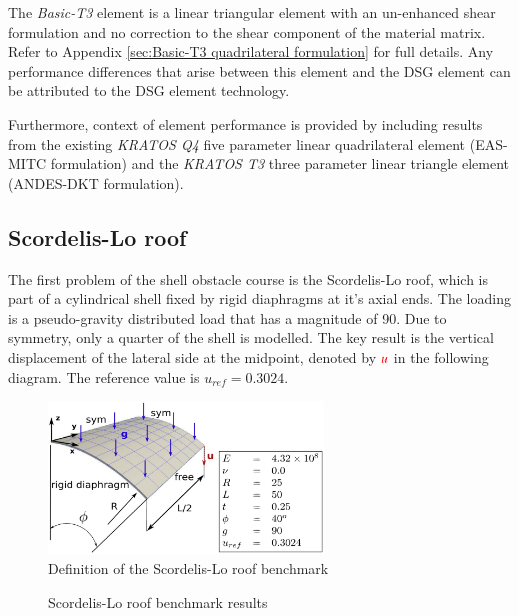 The \textit{Basic-T3} element is a linear triangular element with an un-enhanced shear formulation and no correction to the shear component of the material matrix. Refer to Appendix \ref{sec:Basic-T3 quadrilateral formulation} for full details. Any performance differences that arise between this element and the DSG element can be attributed to the DSG element technology.

Furthermore, context of element performance is provided by including results from the existing \textit{KRATOS Q4} five parameter linear quadrilateral element (EAS-MITC formulation) and the \textit{KRATOS T3} three parameter linear triangle element (ANDES-DKT formulation).
\newpage
\subsection{Scordelis-Lo roof}
%

The first problem of the shell obstacle course is the Scordelis-Lo roof, which is part of a cylindrical shell fixed by rigid diaphragms at it's axial ends. The loading is a pseudo-gravity distributed load that has a magnitude of 90. Due to symmetry, only a quarter of the shell is modelled. The key result is the vertical displacement of the lateral side at the midpoint, denoted by $\textcolor{red}{u}$ in the following diagram. The reference value is $u_{ref} = 0.3024$.
 
  \begin{figure}[H]
 	\centering
 	\def\svgwidth{\columnwidth}
 	\includegraphics[width=7.3cm]{images/scordelisroof.png}
 	\caption{Definition of the Scordelis-Lo roof benchmark\cite{Bou13}}
 \end{figure}
 
\begin{figure}[H]
	\caption{\label{ref_label_overall}Scordelis-Lo roof benchmark results}
\end{figure}

